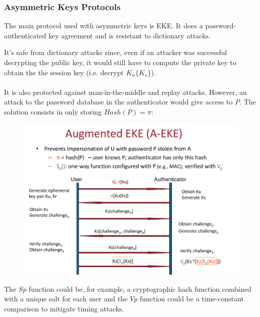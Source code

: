 \documentclass[10pt,a4paper]{report}
\begin{document}
\subsubsection{Asymmetric Keys Protocols}
The main protocol used with asymmetric keys is EKE. It does a password-authenticated key agreement and is resistant to dictionary attacks.
\begin{figure}[H]
\end{figure}
It's safe from dictionary attacks since, even if an attacker was successful decrypting the public key, it would still have to compute the private key to obtain the the session key (i.e. decrypt $K_u\{K_s\}$).\\
\\
It is also protected against man-in-the-middle and replay attacks. However, an attack to the password database in the authenticator would give access to $P$. The solution consists in only storing $Hash(P) = \pi$:
\begin{figure}[H]
\centering
\includegraphics[scale=0.4]{30.png}
\end{figure}
The $Sp$ function could be, for example, a  cryptographic hash function combined with a unique salt for each user and the $Vp$ function could be a time-constant comparison to mitigate timing attacks.
\end{document}
